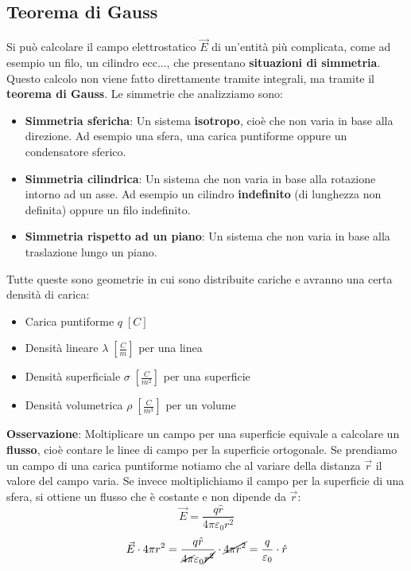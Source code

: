 \documentclass[a4paper]{article}
\begin{document}
\subsection{Teorema di Gauss}
Si può calcolare il campo elettrostatico \( \vec{E} \) di un'entità più complicata, come
ad esempio un filo, un cilindro ecc..., che presentano \textbf{situazioni di simmetria}.
Questo calcolo non viene fatto direttamente tramite integrali, ma tramite il \textbf{teorema
di Gauss}. Le simmetrie che analizziamo sono:
\begin{itemize}
  \item \textbf{Simmetria sfericha}: Un sistema \textbf{isotropo}, cioè che non varia in
    base alla direzione. Ad esempio una sfera, una carica puntiforme oppure un
    condensatore sferico.

  \item \textbf{Simmetria cilindrica}: Un sistema che non varia in base alla rotazione 
    intorno ad un asse. Ad esempio un cilindro \textbf{indefinito} (di lunghezza non 
    definita) oppure un filo indefinito.

  \item \textbf{Simmetria rispetto ad un piano}: Un sistema che non varia in base alla 
    traslazione lungo un piano.
\end{itemize}
Tutte queste sono geometrie in cui sono distribuite cariche e avranno una certa densità
di carica:
\begin{itemize}
  \item Carica puntiforme \( q \; \left[ C \right] \)
  \item Densità lineare \( \lambda \; \left[ \frac{C}{m} \right] \) per una linea
  \item Densità superficiale \( \sigma \; \left[ \frac{C}{m^2} \right] \) per una superficie
  \item Densità volumetrica \( \rho \; \left[ \frac{C}{m^3} \right] \) per un volume
\end{itemize}

\vspace{1em}
\noindent
\textbf{Osservazione}: Moltiplicare un campo per una superficie equivale a calcolare un
\textbf{flusso}, cioè contare le linee di campo per la superficie ortogonale. Se prendiamo
un campo di una carica puntiforme notiamo che al variare della distanza \( \vec{r} \) 
il valore del campo varia. Se invece moltiplichiamo il campo per la superficie di una 
sfera, si ottiene un flusso che è costante e non dipende da \( \vec{r} \):
\[
  \vec{E} = \frac{q \hat{r}}{4 \pi \varepsilon_0 r^2}
\] 
\[
  \vec{E} \cdot 4 \pi r^2 = \frac{q \hat{r}}{\cancel{4 \pi} \varepsilon_0 \cancel{r^2}}
  \cdot \cancel{4 \pi r^2} = \frac{q}{\varepsilon_0} \cdot \hat{r}
\] 
\end{document}
